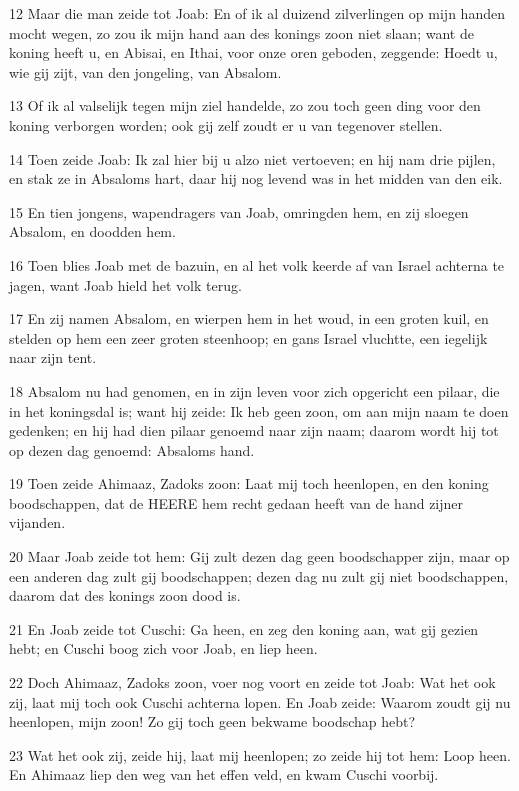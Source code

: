 \par 12 Maar die man zeide tot Joab: En of ik al duizend zilverlingen op mijn handen mocht wegen, zo zou ik mijn hand aan des konings zoon niet slaan; want de koning heeft u, en Abisai, en Ithai, voor onze oren geboden, zeggende: Hoedt u, wie gij zijt, van den jongeling, van Absalom.
\par 13 Of ik al valselijk tegen mijn ziel handelde, zo zou toch geen ding voor den koning verborgen worden; ook gij zelf zoudt er u van tegenover stellen.
\par 14 Toen zeide Joab: Ik zal hier bij u alzo niet vertoeven; en hij nam drie pijlen, en stak ze in Absaloms hart, daar hij nog levend was in het midden van den eik.
\par 15 En tien jongens, wapendragers van Joab, omringden hem, en zij sloegen Absalom, en doodden hem.
\par 16 Toen blies Joab met de bazuin, en al het volk keerde af van Israel achterna te jagen, want Joab hield het volk terug.
\par 17 En zij namen Absalom, en wierpen hem in het woud, in een groten kuil, en stelden op hem een zeer groten steenhoop; en gans Israel vluchtte, een iegelijk naar zijn tent.
\par 18 Absalom nu had genomen, en in zijn leven voor zich opgericht een pilaar, die in het koningsdal is; want hij zeide: Ik heb geen zoon, om aan mijn naam te doen gedenken; en hij had dien pilaar genoemd naar zijn naam; daarom wordt hij tot op dezen dag genoemd: Absaloms hand.
\par 19 Toen zeide Ahimaaz, Zadoks zoon: Laat mij toch heenlopen, en den koning boodschappen, dat de HEERE hem recht gedaan heeft van de hand zijner vijanden.
\par 20 Maar Joab zeide tot hem: Gij zult dezen dag geen boodschapper zijn, maar op een anderen dag zult gij boodschappen; dezen dag nu zult gij niet boodschappen, daarom dat des konings zoon dood is.
\par 21 En Joab zeide tot Cuschi: Ga heen, en zeg den koning aan, wat gij gezien hebt; en Cuschi boog zich voor Joab, en liep heen.
\par 22 Doch Ahimaaz, Zadoks zoon, voer nog voort en zeide tot Joab: Wat het ook zij, laat mij toch ook Cuschi achterna lopen. En Joab zeide: Waarom zoudt gij nu heenlopen, mijn zoon! Zo gij toch geen bekwame boodschap hebt?
\par 23 Wat het ook zij, zeide hij, laat mij heenlopen; zo zeide hij tot hem: Loop heen. En Ahimaaz liep den weg van het effen veld, en kwam Cuschi voorbij.
